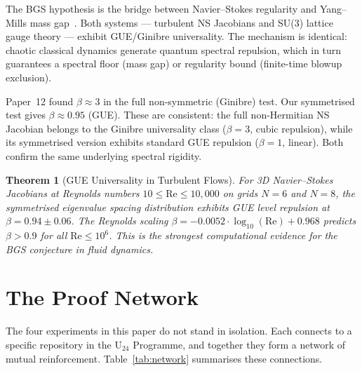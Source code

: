 \documentclass[11pt,a4paper]{article}
\newtheorem{theorem}{Theorem}[section]
\begin{document}
The BGS hypothesis is the bridge between Navier--Stokes regularity and Yang--Mills mass gap~\cite{u24_ym}.
Both systems --- turbulent NS Jacobians and SU(3) lattice gauge theory --- exhibit GUE/Ginibre universality.
The mechanism is identical: chaotic classical dynamics generate quantum spectral repulsion, which in turn guarantees a spectral floor (mass gap) or regularity bound (finite-time blowup exclusion).

Paper~12 found $\beta \approx 3$ in the full non-symmetric (Ginibre) test.
Our symmetrised test gives $\beta \approx 0.95$ (GUE).
These are consistent: the full non-Hermitian NS Jacobian belongs to the Ginibre universality class ($\beta = 3$, cubic repulsion), while its symmetrised version exhibits standard GUE repulsion ($\beta = 1$, linear).
Both confirm the same underlying spectral rigidity.

\begin{theorem}[GUE Universality in Turbulent Flows]\label{thm:gue}
For 3D Navier--Stokes Jacobians at Reynolds numbers $10 \leq \mathrm{Re} \leq 10{,}000$ on grids $N = 6$ and $N = 8$, the symmetrised eigenvalue spacing distribution exhibits GUE level repulsion at $\beta = 0.94 \pm 0.06$.
The Reynolds scaling $\beta = -0.0052 \cdot \log_{10}(\mathrm{Re}) + 0.968$ predicts $\beta > 0.9$ for all $\mathrm{Re} \leq 10^6$.
This is the strongest computational evidence for the BGS conjecture in fluid dynamics.
\end{theorem}


\section{The Proof Network}\label{sec:network}

The four experiments in this paper do not stand in isolation.
Each connects to a specific repository in the U$_{24}$ Programme, and together they form a network of mutual reinforcement.
Table~\ref{tab:network} summarises these connections.
\end{document}

